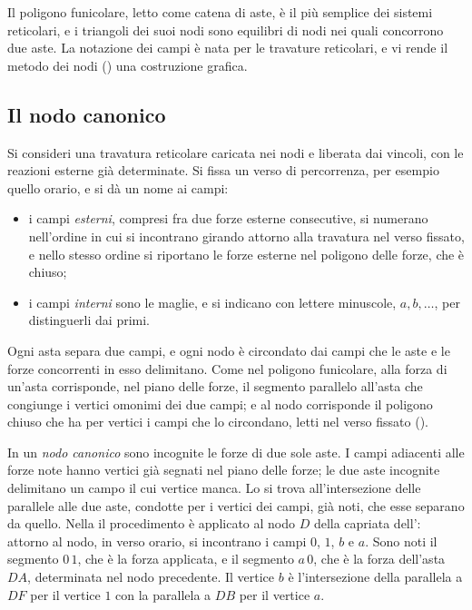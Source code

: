 Il poligono funicolare, letto come catena di aste, è il più semplice dei sistemi reticolari, e i
triangoli dei suoi nodi sono equilibri di nodi nei quali concorrono due aste. La notazione dei
campi è nata per le travature reticolari, e vi rende il metodo dei nodi ()
una costruzione grafica.

\subsection{Il nodo canonico}
\label{sec:nodo_canonico_sgr}

Si consideri una travatura reticolare caricata nei nodi e liberata dai vincoli, con le reazioni
esterne già determinate. Si fissa un verso di percorrenza, per esempio quello orario, e si dà un
nome ai campi:
\begin{itemize}
	\item i campi \emph{esterni}, compresi fra due forze esterne consecutive, si numerano nell'ordine
	in cui si incontrano girando attorno alla travatura nel verso fissato, e nello stesso ordine si
	riportano le forze esterne nel poligono delle forze, che è chiuso;
	\item i campi \emph{interni} sono le maglie, e si indicano con lettere minuscole,
	$a, b, \dots$, per distinguerli dai primi.
\end{itemize}
Ogni asta separa due campi, e ogni nodo è circondato dai campi che le aste e le forze concorrenti
in esso delimitano. Come nel poligono funicolare, alla forza di un'asta corrisponde, nel piano
delle forze, il segmento parallelo all'asta che congiunge i vertici omonimi dei due campi; e al
nodo corrisponde il poligono chiuso che ha per vertici i campi che lo circondano, letti nel verso
fissato ().

In un \emph{nodo canonico} sono incognite le forze di due sole aste. I campi adiacenti alle forze
note hanno vertici già segnati nel piano delle forze; le due aste incognite delimitano un campo
il cui vertice manca. Lo si trova all'intersezione delle parallele alle due aste, condotte per i
vertici dei campi, già noti, che esse separano da quello. Nella
 il procedimento è applicato al nodo $D$ della capriata
dell': attorno al nodo, in verso orario, si incontrano i campi
$0$, $1$, $b$ e $a$. Sono noti il segmento $0\,1$, che è la forza applicata, e
il segmento $a\,0$, che è la forza dell'asta $DA$, determinata nel nodo precedente. Il
vertice $b$ è l'intersezione della parallela a $DF$ per il vertice $1$ con la parallela
a $DB$ per il vertice $a$.

